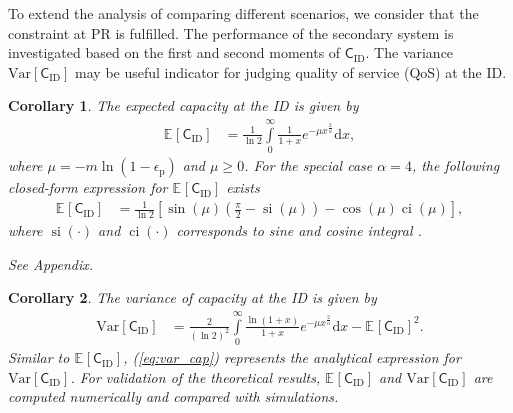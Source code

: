\documentclass[conference, twocolumn]{IEEEtran}
\newcommand{\e}[2]{{\mathbb E}_{#1}\left[ #2 \right]}
\newcommand{\sub}[1]{_{\text{#1}}}
\DeclareMathOperator*{\cosi}{ci}
\DeclareMathOperator*{\sini}{si}
\newtheorem{coro}{Corollary}
\begin{document}
To extend the analysis of comparing different scenarios, we consider that the constraint at PR is fulfilled. The performance of the secondary system is investigated based on the first and second moments of $\mathsf{C}\sub{ID}$. The variance $\text{Var} [ \mathsf{C}_{\text{ID}} ]$ may be useful indicator for judging quality of service (QoS) at the ID. 
\begin{coro}
\normalfont
The expected capacity at the ID is given by 
\begin{align}
\e{}{\mathsf{C}_{\text{ID}}} &= \frac{1}{\ln 2} \int\limits_{0}^{\infty} \frac{1}{1+ x} e^{-\mu x^{\frac{2}{\alpha}}} \text{d}x, \label{eq:Exp_Cap}
\end{align}  
where  $\mu = - m \ln \left({1 - \epsilon{\sub{p}}}\right)$ and $\mu \ge 0$. 
For the special case $\alpha = 4$, the following closed-form expression for $\e{}{\mathsf{C}_{\text{ID}}}$ exists 
\begin{align} 
\e{}{\mathsf{C}_{\text{ID}}} &= \frac{1}{\ln 2} \left[ \sin(\mu) \left( \frac{\pi}{2} - \sini(\mu) \right) - \cos(\mu) \cosi(\mu) \right], \label{eq:Exp_Cap_4}  
\end{align}
where $\sini(\cdot)$ and $\cosi(\cdot)$ corresponds to sine and cosine integral \cite{grad}.  
\begin{IEEEproof}
See Appendix.
\end{IEEEproof}
\end{coro}
\begin{coro}
\normalfont
The variance of capacity at the ID is given by 
\begin{align}
\text{Var} [ \mathsf{C}_{\text{ID}} ] &=  \frac{2}{(\ln 2)^2} \int\limits_{0}^{\infty} \frac{\ln(1 + x )}{1 + x} e^{-\mu x^{\frac{2}{\alpha}}} \text{d}x -  {\e{}{\mathsf{C}_{\text{ID}}} }^2. 
\label{eq:var_cap}
\end{align}
Similar to $\e{}{\mathsf{C}_{\text{ID}}}$, (\ref{eq:var_cap}) represents the analytical expression for $\text{Var} [ \mathsf{C}_{\text{ID}} ]$. For validation of the theoretical results, $\e{}{\mathsf{C}_{\text{ID}}}$ and $\text{Var} [ \mathsf{C}_{\text{ID}} ]$ are computed numerically and compared with simulations. 
\end{coro}
\end{document}
